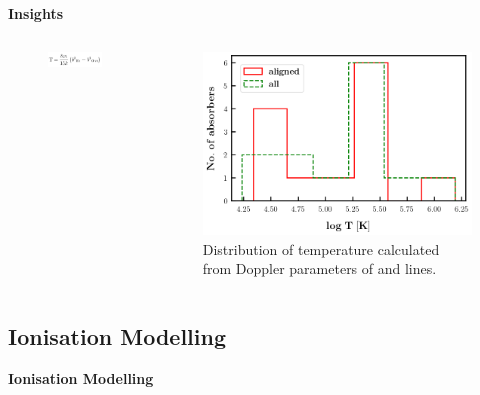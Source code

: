 \documentclass[aspectratio=169]{beamer}
\newcommand\ion[2]{\text{#1\,\textsc{\lowercase{#2}}}}
\begin{document}
\begin{frame}[noframenumbering]{\huge{{\textbf{Insights}}}}


\begin{columns}
  \begin{column}{0.2\textwidth} 
    \vspace*{-18mm}
    \begin{figure}[!htbp]
      \centering
      \includegraphics[width=3.5cm]{Figures/T.png}
    \end{figure}
    
    
  \end{column}      

  \begin{column}{0.8\textwidth}

    \vspace*{-5mm}

    \begin{figure}[!htbp]
      \centering
      \includegraphics[width=9cm]{Figures/T_histogram.png}
      \vspace*{-1mm}
      \caption{Distribution of temperature calculated from Doppler parameters of \ion{H}{i} and \ion{O}{vi} lines.}
    \end{figure}
  \end{column}

\end{columns}



\end{frame}


\begin{frame}{}

\section{Ionisation Modelling}

\vspace*{1cm}

{\huge{\textbf{Ionisation Modelling}}}

\end{frame}
\end{document}
